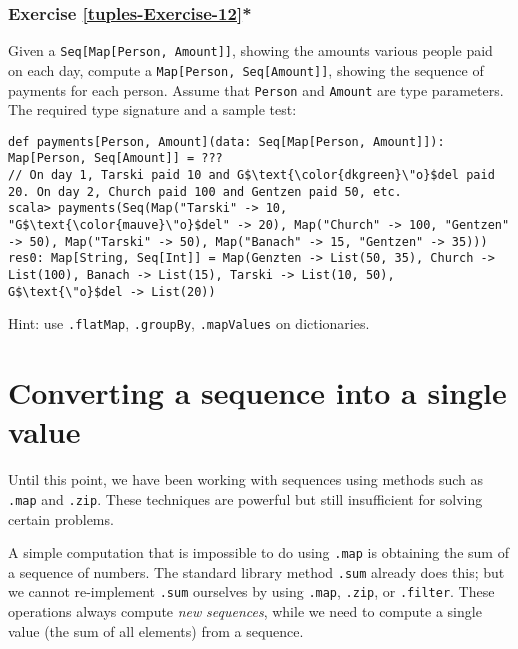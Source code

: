 \subsubsection{Exercise \label{tuples-Exercise-12}\ref{tuples-Exercise-12}{*}}

Given a \lstinline!Seq[Map[Person, Amount]]!, showing the amounts
various people paid on each day, compute a \lstinline!Map[Person, Seq[Amount]]!,
showing the sequence of payments for each person. Assume that \lstinline!Person!
and \lstinline!Amount! are type parameters. The required type signature
and a sample test:
\begin{lstlisting}[mathescape=true]
def payments[Person, Amount](data: Seq[Map[Person, Amount]]): Map[Person, Seq[Amount]] = ???
// On day 1, Tarski paid 10 and G$\text{\color{dkgreen}\"o}$del paid 20. On day 2, Church paid 100 and Gentzen paid 50, etc.
scala> payments(Seq(Map("Tarski" -> 10, "G$\text{\color{mauve}\"o}$del" -> 20), Map("Church" -> 100, "Gentzen" -> 50), Map("Tarski" -> 50), Map("Banach" -> 15, "Gentzen" -> 35)))
res0: Map[String, Seq[Int]] = Map(Genzten -> List(50, 35), Church -> List(100), Banach -> List(15), Tarski -> List(10, 50), G$\text{\"o}$del -> List(20))
\end{lstlisting}

Hint: use \lstinline!.flatMap!, \lstinline!.groupBy!, \lstinline!.mapValues!
on dictionaries.%
\begin{comment}
Solution:
\begin{lstlisting}
def payments[Person, Amount](data: Seq[Map[Person, Amount]]): Map[Person, Seq[Amount]] = data.flatMap(_.toSeq).groupBy(_._1).mapValues(_.map(_._2))
\end{lstlisting}
\end{comment}


\section{Converting a sequence into a single value}

Until this point, we have been working with sequences using methods
such as \lstinline!.map! and \lstinline!.zip!. These techniques
are powerful but still insufficient for solving certain problems.

A simple computation that is impossible to do using \lstinline!.map!
is obtaining the sum of a sequence of numbers. The standard library
method \lstinline!.sum! already does this; but we cannot re-implement
\lstinline!.sum! ourselves by using \lstinline!.map!, \lstinline!.zip!,
or \lstinline!.filter!. These operations always compute \emph{new}
\emph{sequences}, while we need to compute a single value (the sum
of all elements) from a sequence. 

